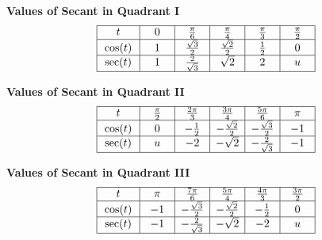 \documentclass[nooutcomes, noauthor]{ximera}
\begin{document}
\begin{center}
\textbf{Values of Secant in Quadrant I}
\renewcommand*{\arraystretch}{2.5}
\setlength{\arrayrulewidth}{0.5mm}
\setlength{\tabcolsep}{18pt}
\[
\begin{array}{|>{\centering\arraybackslash$} p{1cm} <{$} | >{\centering\arraybackslash$} p{.75cm} <{$} |  >{\centering\arraybackslash$} p{.75cm} <{$} |  >{\centering\arraybackslash$} p{.75cm} <{$} |  >{\centering\arraybackslash$} p{.75cm} <{$} |  >{\centering\arraybackslash$} p{.75cm} <{$} |}
\hline 
t & 0 & \frac{\pi}{6} & \frac{\pi}{4} & \frac{\pi}{3} & \frac{\pi}{2}\\
\hline
\cos(t) & 1 & \frac{\sqrt{3}}{2} & \frac{\sqrt{2}}{2} & \frac{1}{2} & 0\\
\hline
\sec(t) & 1 & \frac{2}{\sqrt{3}}& \sqrt{2} & 2 & u\\
\hline 
\end{array}
\]
\end{center}

\begin{center}
\textbf{Values of Secant in Quadrant II}
\renewcommand*{\arraystretch}{2.5}
\setlength{\arrayrulewidth}{0.5mm}
\setlength{\tabcolsep}{18pt}
\[
\begin{array}{|>{\centering\arraybackslash$} p{1cm} <{$} | >{\centering\arraybackslash$} p{.75cm} <{$} |  >{\centering\arraybackslash$} p{.75cm} <{$} |  >{\centering\arraybackslash$} p{.75cm} <{$} |  >{\centering\arraybackslash$} p{.75cm} <{$} |  >{\centering\arraybackslash$} p{.75cm} <{$} |}
\hline 
t & \frac{\pi}{2} & \frac{2\pi}{3} & \frac{3\pi}{4} & \frac{5\pi}{6} & \pi\\
\hline
\cos(t) & 0 & -\frac{1}{2} &-\frac{\sqrt{2}}{2} & -\frac{\sqrt{3}}{2} & -1\\
\hline
\sec(t) & u & -2& -\sqrt{2} & -\frac{2}{\sqrt{3}}& -1\\
\hline 
\end{array}
\]
\end{center}

\begin{center}
\textbf{Values of Secant in Quadrant III}
\renewcommand*{\arraystretch}{2.5}
\setlength{\arrayrulewidth}{0.5mm}
\setlength{\tabcolsep}{18pt}
\[
\begin{array}{|>{\centering\arraybackslash$} p{1cm} <{$} | >{\centering\arraybackslash$} p{.75cm} <{$} |  >{\centering\arraybackslash$} p{.75cm} <{$} |  >{\centering\arraybackslash$} p{.75cm} <{$} |  >{\centering\arraybackslash$} p{.75cm} <{$} |  >{\centering\arraybackslash$} p{.75cm} <{$} |}
\hline 
t & \pi & \frac{7\pi}{6} & \frac{5\pi}{4} & \frac{4\pi}{3} & \frac{3\pi}{2}\\
\hline
\cos(t) & -1 & -\frac{\sqrt{3}}{2} & -\frac{\sqrt{2}}{2} & -\frac{1}{2} & 0\\
\hline
\sec(t) & -1 & -\frac{2}{\sqrt{3}}& -\sqrt{2} & -2 & u\\
\hline 
\end{array}
\]
\end{center}
\end{document}
